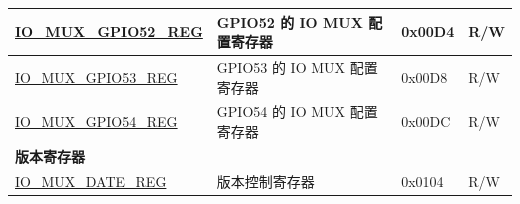\begin{longtable}{ | p{6cm} | p{7.2cm} | p{1.3cm} | p{1cm} | }
\hyperref[regdesc:IOMUXGPIONREG]{IO\_MUX\_GPIO52\_REG} & GPIO52 的 IO MUX 配置寄存器 & 0x00D4 & R/W \\ \hline
\hyperref[regdesc:IOMUXGPIONREG]{IO\_MUX\_GPIO53\_REG} & GPIO53 的 IO MUX 配置寄存器 & 0x00D8 & R/W \\ \hline
\hyperref[regdesc:IOMUXGPIONREG]{IO\_MUX\_GPIO54\_REG} & GPIO54 的 IO MUX 配置寄存器 & 0x00DC & R/W \\ \hline
\multicolumn{4}{|l|}{\textbf{版本寄存器}} \\ \hline
\hyperref[regdesc:IOMUXDATEREG]{IO\_MUX\_DATE\_REG} & 版本控制寄存器 & 0x0104 & R/W \\ \hline
\end{longtable}
